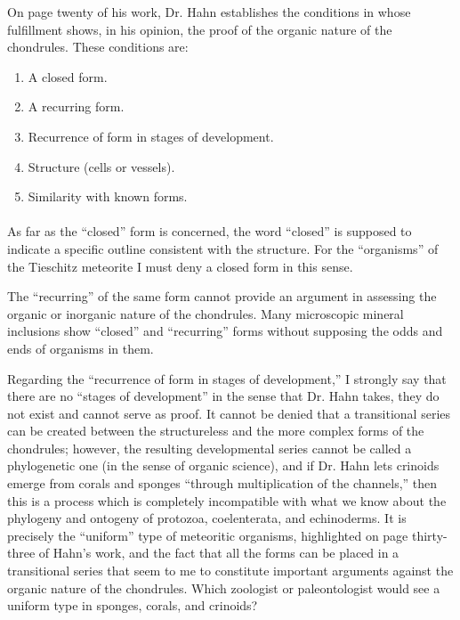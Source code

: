 \documentclass[a4paper, 12pt, oneside]{article}
\begin{document}
On page twenty of his work, Dr. Hahn establishes the conditions in whose fulfillment shows, in his opinion, the proof of the organic nature of the chondrules. These conditions are:

\begin{enumerate}
    \item A closed form.
    \item A recurring form.
    \item Recurrence of form in stages of development.
    \item Structure (cells or vessels).
    \item Similarity with known forms.
\end{enumerate}

\paragraph*{}
As far as the ``closed'' form is concerned, the word ``closed'' is supposed to indicate a specific outline consistent with the structure. For the ``organisms'' of the Tieschitz meteorite I must deny a closed form in this sense.

The ``recurring'' of the same form cannot provide an argument in assessing the organic or inorganic nature of the chondrules. Many microscopic mineral inclusions show ``closed'' and ``recurring'' forms without supposing the odds and ends of organisms in them.

Regarding the ``recurrence of form in stages of development,'' I strongly say that there are no ``stages of development'' in the sense that Dr. Hahn takes, they do not exist and cannot serve as proof. It cannot be denied that a transitional series can be created between the structureless and the more complex forms of the chondrules; however, the resulting developmental series cannot be called a phylogenetic one (in the sense of organic science), and if Dr. Hahn lets crinoids emerge from corals and sponges ``through multiplication of the channels,'' then this is a process which is completely incompatible with what we know about the phylogeny and ontogeny of protozoa, coelenterata, and echinoderms. It is precisely the ``uniform'' type of meteoritic organisms, highlighted on page thirty-three of Hahn's work, and the fact that all the forms can be placed in a transitional series that seem to me to constitute important arguments against the organic nature of the chondrules. Which zoologist or paleontologist would see a uniform type in sponges, corals, and crinoids?
\end{document}
